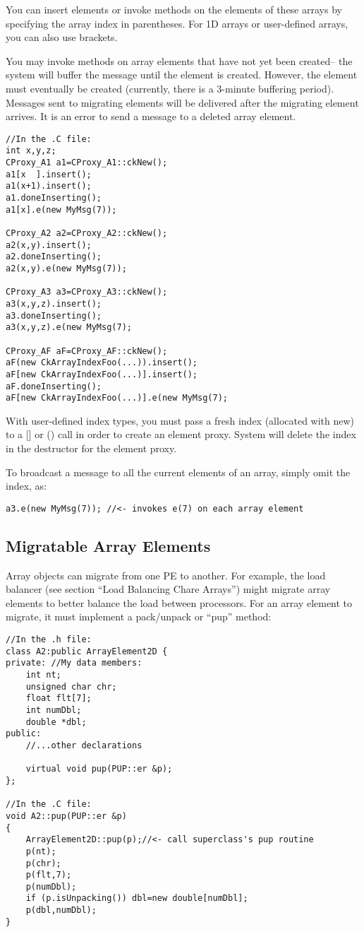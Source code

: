 You can insert elements or invoke methods on the elements of these
arrays by specifying the array index in parentheses.  For 1D 
arrays or user-defined arrays, you can also use brackets.

You may invoke methods on array elements that have not yet
been created-- the system will buffer the message until the
element is created.  However, the element must eventually be 
created (currently, there is a 3-minute buffering period).
Messages sent to migrating elements will be delivered after
the migrating element arrives.  It is an error to send 
a message to a deleted array element.

\begin{verbatim}
//In the .C file:
int x,y,z;
CProxy_A1 a1=CProxy_A1::ckNew();
a1[x  ].insert(); 
a1(x+1).insert();
a1.doneInserting();
a1[x].e(new MyMsg(7));

CProxy_A2 a2=CProxy_A2::ckNew(); 
a2(x,y).insert();
a2.doneInserting();
a2(x,y).e(new MyMsg(7));

CProxy_A3 a3=CProxy_A3::ckNew();
a3(x,y,z).insert();
a3.doneInserting();
a3(x,y,z).e(new MyMsg(7);

CProxy_AF aF=CProxy_AF::ckNew();
aF(new CkArrayIndexFoo(...)).insert();
aF[new CkArrayIndexFoo(...)].insert();
aF.doneInserting();
aF[new CkArrayIndexFoo(...)].e(new MyMsg(7);

\end{verbatim}
With user-defined index types, you must pass a fresh index 
(allocated with new) to a [] or () call in order to create an element proxy.
System will delete the index in the destructor for the element proxy.

To broadcast a message to all the current elements of an array, 
simply omit the index, as:

\begin{verbatim}
a3.e(new MyMsg(7)); //<- invokes e(7) on each array element
\end{verbatim}

\subsection{Migratable Array Elements}
Array objects can migrate from one PE to another.
For example, the load balancer (see section ``Load Balancing Chare Arrays'')
might migrate array elements to better balance the load between
processors.  For an array element to migrate, it must implement
a pack/unpack or ``pup'' method:

\begin{verbatim}
//In the .h file:
class A2:public ArrayElement2D {
private: //My data members:
    int nt;
    unsigned char chr;
    float flt[7];
    int numDbl;
    double *dbl;
public:	
    //...other declarations

    virtual void pup(PUP::er &p);
};

//In the .C file:
void A2::pup(PUP::er &p)
{
    ArrayElement2D::pup(p);//<- call superclass's pup routine
    p(nt);
    p(chr);
    p(flt,7);
    p(numDbl);
    if (p.isUnpacking()) dbl=new double[numDbl];
    p(dbl,numDbl);
}
\end{verbatim}

